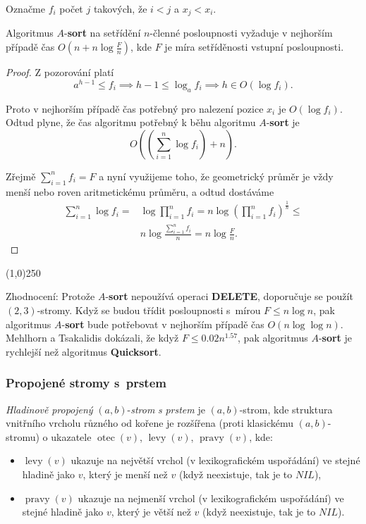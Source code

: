 \documentclass[a4paper,12pt]{article}
\newenvironment{pitemize}{
 \begin{itemize}
   \setlength{\itemsep}{1pt}
   \setlength{\parskip}{0pt}
   \setlength{\parsep}{0pt}
 }{\end{itemize}}
\newenvironment{myproof}{
  \begin{proof}
    
  }{
  \end{proof}
  \begin{center}
   \line(1,0){250}
   \end{center}
  }
\DeclareMathOperator*{\otec}{otec}
\DeclareMathOperator*{\levy}{levy}
\DeclareMathOperator*{\pravy}{pravy}
\begin{document}
\begin{definice}
    Označme $f_i$ počet $j$ takových, že $i<j$ a $x_j<x_i$.
\end{definice}

\begin{veta}Algoritmus $A$-{\bf sort} na setřídění $
n$-členné 
posloupnosti vyžaduje v nejhorším případě čas 
$O(n+n\log\frac Fn)$, kde $F$ je míra setříděnosti vstupní 
posloupnosti.
\end{veta}

\begin{myproof}

Z pozorování platí 
$$a^{h-1}\le f_i\implies h-1\le\log_af_i\implies h\in O(\log f_i).$$

Proto v nejhorším případě čas potřebný pro nalezení 
pozice $x_i$ je $O(\log f_i)$. Odtud plyne, že čas algoritmu potřebný k 
běhu algoritmu $A$-{\bf sort} je 
$$O((\sum_{i=1}^n\log f_i)+n).$$

Zřejmě $\sum_{i=1}^nf_i=F$ a nyní využijeme toho, že geometrický 
průměr je vždy menší nebo roven aritmetickému 
průměru, a odtud dostáváme 
\begin{align*}\sum_{i=1}^n\log f_i=&\log\prod_{i=1}^nf_i=n\log(\prod_{i
=1}^nf_i)^{\frac 1n}\le\\
&n\log\frac {\sum_{i=1}^nf_i}n=n\log\frac Fn.\end{align*}
\end{myproof}

Zhodnocení: Protože $A$-{\bf sort} nepoužívá operaci 
{\bf DELETE}, doporučuje se použít $(2,3)$-stromy. Když se 
budou třídit posloupnosti s~mírou $F\le n\log n$, pak 
algoritmus $A$-{\bf sort} bude potře\-bo\-vat v nejhorším případě 
čas $O(n\log\log n)$. Mehlhorn a Tsa\-kalidis dokázali, že když 
$F\le 0.02n^{1.57}$, pak algoritmus $A$-{\bf sort} je rychlejší než 
algoritmus {\bf Quicksort}.

\subsubsection{Propojené stromy s~prstem}

\emph{Hladinově} \emph{propojený} $(a,b)$-\emph{strom} \emph{s} 
\emph{prstem} je $(a,b)$-strom, kde struktura vnitřního 
vrcholu různého od kořene je 
rozšířena (proti klasickému $(a,b)$-stromu) o 
ukazatele $\otec(v)$, $\levy(v)$, $\pravy(v)$, kde:
\begin{pitemize} 
\item $\levy(v)$ ukazuje na největší vrchol (v lexikografic\-kém 
uspořá\-dá\-ní) ve stejné hladině jako $v$, který je menší než 
$v$ (když neexistuje, tak je to $NIL$), 
\item $\pravy(v)$ ukazuje na nejmenší vrchol (v lexikografic\-kém 
uspořá\-dá\-ní) ve stejné hladině jako $v$, který je větší než 
$v$ (když ne\-existuje, tak je to $NIL$).
\end{pitemize} 
    
\end{document}

